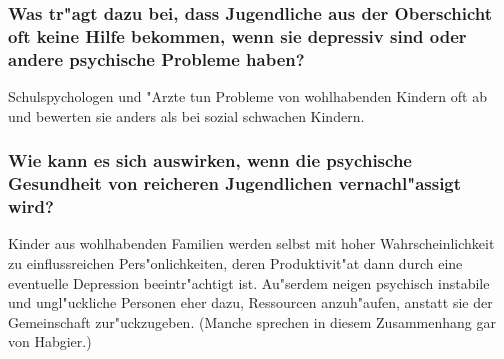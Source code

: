 \subsubsection{Was tr"agt dazu bei, dass Jugendliche aus der Oberschicht oft keine Hilfe bekommen, wenn sie depressiv sind oder andere psychische Probleme haben?}
Schulspychologen und "Arzte tun Probleme von wohlhabenden Kindern oft ab und bewerten sie anders als bei sozial schwachen Kindern. 

\subsubsection{Wie kann es sich auswirken, wenn die psychische Gesundheit von reicheren Jugendlichen vernachl"assigt wird?}
Kinder aus wohlhabenden Familien werden selbst mit hoher Wahrscheinlichkeit zu einflussreichen Pers"onlichkeiten, deren Produktivit"at dann durch eine eventuelle Depression beeintr"achtigt ist. Au"serdem neigen psychisch instabile und ungl"uckliche Personen eher dazu, Ressourcen anzuh"aufen, anstatt sie der Gemeinschaft zur"uckzugeben. (Manche sprechen in diesem Zusammenhang gar von Habgier.)

